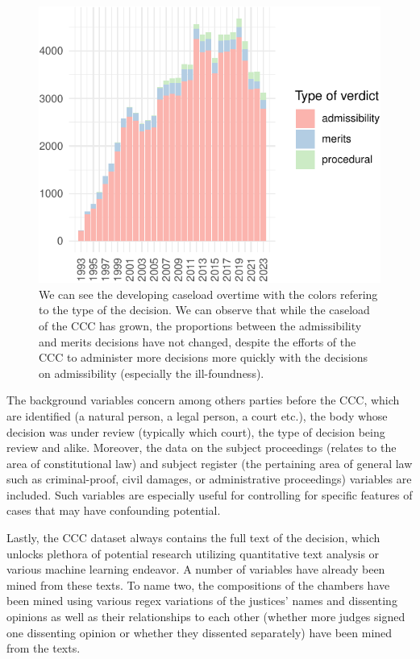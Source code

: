 \documentclass[
  11pt,
]{article}
\begin{document}
\begin{figure}
\centering
\includegraphics{ANONYMIZED_The_Czech_Constitutional_Court_Dataset_files/figure-latex/caseload-1.pdf}
\caption{We can see the developing caseload overtime with the colors
refering to the type of the decision. We can observe that while the
caseload of the CCC has grown, the proportions between the admissibility
and merits decisions have not changed, despite the efforts of the CCC to
administer more decisions more quickly with the decisions on
admissibility (especially the ill-foundness).}
\end{figure}

The background variables concern among others parties before the CCC,
which are identified (a natural person, a legal person, a court etc.),
the body whose decision was under review (typically which court), the
type of decision being review and alike. Moreover, the data on the
subject proceedings (relates to the area of constitutional law) and
subject register (the pertaining area of general law such as
criminal-proof, civil damages, or administrative proceedings) variables
are included. Such variables are especially useful for controlling for
specific features of cases that may have confounding potential.

Lastly, the CCC dataset always contains the full text of the decision,
which unlocks plethora of potential research utilizing quantitative text
analysis or various machine learning endeavor. A number of variables
have already been mined from these texts. To name two, the compositions
of the chambers have been mined using various regex variations of the
justices' names and dissenting opinions as well as their relationships
to each other (whether more judges signed one dissenting opinion or
whether they dissented separately) have been mined from the texts.
\end{document}
